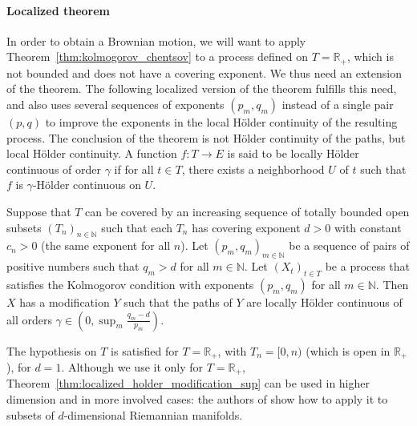 \documentclass[lean]{Draft}
\makeatletter
\newcommand\leanlink{\begingroup\catcode`\#=12\relax\@leanlink}
\newcommand\@leanlink[2]{\endgroup
\href{#1}
{\texttt{\detokenize{#2}}}}
\newcommand{\bmlink}[3]{%
\leanlink{https://github.com/RemyDegenne/brownian-motion/blob/8fd8dc52830cdd07cf9cc8eadd533e284425fa6f/BrownianMotion/#1.lean\##2}
{#3}}
\makeatother
\begin{document}



\paragraph{Localized theorem}

In order to obtain a Brownian motion, we will want to apply Theorem~\ref{thm:kolmogorov_chentsov} to a process defined on $T = \mathbb{R}_+$, which is not bounded and does not have a covering exponent.
We thus need an extension of the theorem.
The following localized version of the theorem fulfills this need, and also uses several sequences of exponents $(p_m, q_m)$ instead of a single pair $(p, q)$ to improve the exponents in the local Hölder continuity of the resulting process.
The conclusion of the theorem is not Hölder continuity of the paths, but local Hölder continuity.
A function $f : T \to E$ is said to be locally Hölder continuous of order $\gamma$ if for all $t \in T$, there exists a neighborhood $U$ of $t$ such that $f$ is $\gamma$-Hölder continuous on $U$.

\begin{theorem}[\bmlink{Continuity/KolmogorovChentsov}{L1085-L1091}{ProbabilityTheory.exists_modification_holder_iSup}]\label{thm:localized_holder_modification_sup}
Suppose that $T$ can be covered by an increasing sequence of totally bounded open subsets $(T_n)_{n \in \mathbb{N}}$ such that each $T_n$ has covering exponent $d > 0$ with constant $c_n > 0$ (the same exponent for all $n$).
Let $(p_m, q_m)_{m \in \mathbb{N}}$ be a sequence of pairs of positive numbers such that $q_m > d$ for all $m \in \mathbb{N}$.
Let $(X_t)_{t \in T}$ be a process that satisfies the Kolmogorov condition with exponents $(p_m, q_m)$ for all $m \in \mathbb{N}$.
Then $X$ has a modification $Y$ such that the paths of $Y$ are locally Hölder continuous of all orders $\gamma \in \left(0, \sup_m \frac{q_m - d}{p_m}\right)$.
\end{theorem}

The hypothesis on $T$ is satisfied for $T = \mathbb{R}_+$, with $T_n = [0,n)$ (which is open in $\mathbb{R}_+$), for $d = 1$.
Although we use it only for $T = \mathbb{R}_+$, Theorem~\ref{thm:localized_holder_modification_sup} can be used in higher dimension and in more involved cases: the authors of \cite{kratschmer2023kolmogorov} show how to apply it to subsets of $d$-dimensional Riemannian manifolds.
\end{document}
